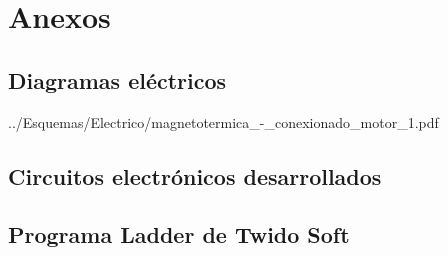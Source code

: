 


\chapter{Anexos}
\label{ch:anexos}

\cleardoublepage
\section{Diagramas eléctricos}
\label{anexo:diag}

{../Esquemas/Electrico/magnetotermica_-_conexionado_motor_1.pdf}





\cleardoublepage
\section{Circuitos electrónicos desarrollados}
\label{anexo:circuitos}




\cleardoublepage
\section{Programa Ladder de Twido Soft}
\label{anexo:programaLadder}

